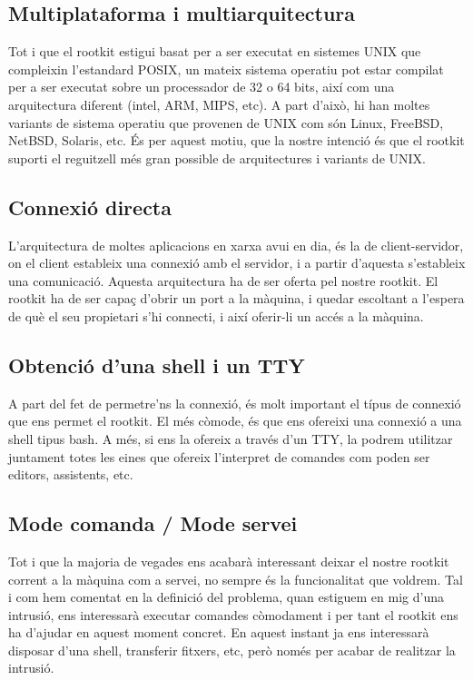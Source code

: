 \subsection{Multiplataforma i multiarquitectura}
Tot i que el rootkit estigui basat per a ser executat en sistemes UNIX que compleixin l'estandard POSIX, un mateix sistema 
operatiu pot estar compilat per a ser executat sobre un processador de 32 o 64 bits, així com una arquitectura diferent
(intel, ARM, MIPS, etc). A part d'això, hi han moltes variants de sistema operatiu que provenen de UNIX com són  Linux, 
FreeBSD, NetBSD, Solaris, etc. És per aquest motiu, que la nostre intenció és que el rootkit suporti el reguitzell més gran 
possible de arquitectures i variants de UNIX.

\subsection{Connexió directa}
L'arquitectura de moltes aplicacions en xarxa avui en dia, és la de client-servidor, on el client estableix una connexió
amb el servidor, i a partir d'aquesta s'estableix una comunicació. Aquesta arquitectura ha de ser oferta pel nostre rootkit. 
El rootkit ha de ser capaç d'obrir un port a la màquina, i quedar escoltant a l'espera de què el seu propietari s'hi connecti,
i així oferir-li un accés a la màquina.

\subsection{Obtenció d'una shell i un TTY}
A part del fet de permetre'ns la connexió, és molt important el típus de connexió que ens permet el rootkit. El més còmode, és que ens
ofereixi una connexió a una shell tipus bash. A més, si ens la ofereix a través d'un TTY, la podrem utilitzar juntament totes les eines
que ofereix l'interpret de comandes com poden ser editors, assistents, etc.

\subsection{Mode comanda / Mode servei}
Tot i que la majoria de vegades ens acabarà interessant deixar el nostre rootkit corrent a la màquina com a servei, no sempre
és la funcionalitat que voldrem. Tal i com hem comentat en la definició del problema, quan estiguem en mig d'una intrusió, ens interessarà
executar comandes còmodament i per tant el rootkit ens ha d'ajudar en aquest moment concret. En aquest instant ja ens interessarà 
disposar d'una shell, transferir fitxers, etc, però només per acabar de realitzar la intrusió.

